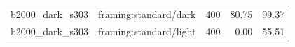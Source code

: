 \begin{longtable}{l>{\raggedright\arraybackslash}p{.42\linewidth}rrr}
b2000\_\allowbreak{}dark\_\allowbreak{}s303 & %
framing:standard/dark & %
400 & %
80.75 & %
99.37 \\ %

b2000\_\allowbreak{}dark\_\allowbreak{}s303 & %
framing:standard/light & %
400 & %
0.00 & %
55.51 \\ %


\end{longtable}
